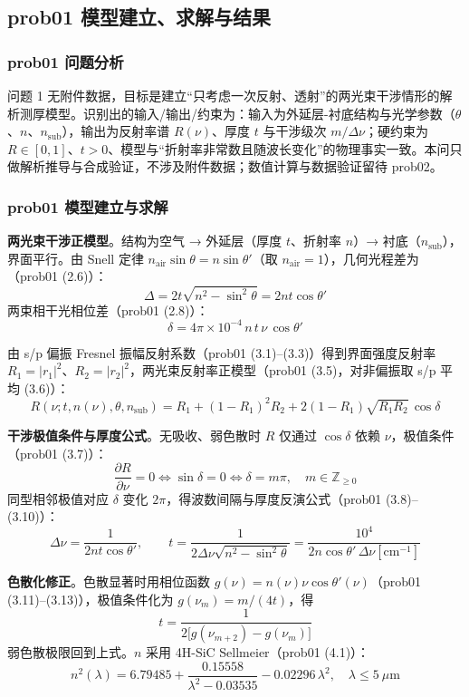 \subsection{prob01
模型建立、求解与结果}\label{prob01-ux6a21ux578bux5efaux7acbux6c42ux89e3ux4e0eux7ed3ux679c}

\subsubsection{prob01 问题分析}\label{prob01-ux95eeux9898ux5206ux6790}

问题 1
无附件数据，目标是建立``只考虑一次反射、透射''的两光束干涉情形的解析测厚模型。识别出的输入/输出/约束为：输入为外延层-衬底结构与光学参数（\(\theta\)、\(n\)、\(n_{\mathrm{sub}}\)），输出为反射率谱
\(R(\nu)\)、厚度 \(t\) 与干涉级次 \(m/\Delta\nu\)；硬约束为
\(R\in[0,1]\)、\(t>0\)、模型与``折射率非常数且随波长变化''的物理事实一致。本问只做解析推导与合成验证，不涉及附件数据；数值计算与数据验证留待
prob02。

\subsubsection{prob01
模型建立与求解}\label{prob01-ux6a21ux578bux5efaux7acbux4e0eux6c42ux89e3}

\textbf{两光束干涉正模型}。结构为空气 → 外延层（厚度 \(t\)、折射率
\(n\)）→ 衬底（\(n_{\mathrm{sub}}\)），界面平行。由 Snell 定律
\(n_{\mathrm{air}}\sin\theta=n\sin\theta'\)（取
\(n_{\mathrm{air}}=1\)），几何光程差为（prob01 (2.6)）：
\[\Delta=2t\sqrt{n^2-\sin^2\theta}=2nt\cos\theta'\]
两束相干光相位差（prob01 (2.8)）：
\[\delta=4\pi\times10^{-4}\,n\,t\,\nu\,\cos\theta'\]

由 s/p 偏振 Fresnel 振幅反射系数（prob01
(3.1)--(3.3)）得到界面强度反射率
\(R_1=\lvert r_1\rvert^2\)、\(R_2=\lvert r_2\rvert^2\)，两光束反射率正模型（prob01
(3.5)，对非偏振取 s/p 平均 (3.6)）：
\[R(\nu;t,n(\nu),\theta,n_{\mathrm{sub}})=R_1+(1-R_1)^2R_2+2(1-R_1)\sqrt{R_1R_2}\,\cos\delta\]

\textbf{干涉极值条件与厚度公式}。无吸收、弱色散时 \(R\) 仅通过
\(\cos\delta\) 依赖 \(\nu\)，极值条件（prob01 (3.7)）：
\[\frac{\partial R}{\partial\nu}=0\iff\sin\delta=0\iff\delta=m\pi,\quad m\in\mathbb{Z}_{\ge0}\]
同型相邻极值对应 \(\delta\) 变化
\(2\pi\)，得波数间隔与厚度反演公式（prob01 (3.8)--(3.10)）：
\[\Delta\nu=\frac{1}{2nt\cos\theta'},\qquad t=\frac{1}{2\Delta\nu\sqrt{n^2-\sin^2\theta}}=\frac{10^4}{2n\cos\theta'\,\Delta\nu[\mathrm{cm}^{-1}]}\]

\textbf{色散化修正}。色散显著时用相位函数
\(g(\nu)=n(\nu)\nu\cos\theta'(\nu)\)（prob01
(3.11)--(3.13)），极值条件化为 \(g(\nu_m)=m/(4t)\)，得
\[t=\frac{1}{2\big[g(\nu_{m+2})-g(\nu_m)\big]}\]
弱色散极限回到上式。\(n\) 采用 4H-SiC Sellmeier（prob01 (4.1)）：
\[n^2(\lambda)=6.79485+\frac{0.15558}{\lambda^2-0.03535}-0.02296\,\lambda^2,\quad\lambda\le5\ \mu\mathrm{m}\]

